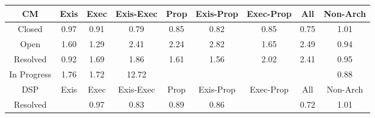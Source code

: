 \begin{tabular}{|c||c|c|c|c|c|c|c|c|}
\hline
\hline
CM & Exis & Exec & Exis-Exec & Prop & Exis-Prop & Exec-Prop & All & Non-Arch \\ 
\hline
Closed & \cellcolor[rgb]{0.9033971045751237,0.8087462949889188,0.4138372976034488} 0.97 & \cellcolor[rgb]{0.8916004190918556,0.7529086503681165,0.40282705781906525} 0.91 & \cellcolor[rgb]{0.8685648519067422,0.6438736323585793,0.3813271951129593} 0.79 & \cellcolor[rgb]{0.8807291226256074,0.7014511804278748,0.39268051445056684} 0.85 & \cellcolor[rgb]{0.8747451631553648,0.6731271056020599,0.3870954856116738} 0.82 & \cellcolor[rgb]{0.8802017540393747,0.6989549691197069,0.392188303770083} 0.85 & \cellcolor[rgb]{0.85983481583806,0.6025514616334836,0.37317916144885593} 0.75 & \cellcolor[rgb]{0.9096891000821404,0.8398527316178559,0.42} 1.01 \\ 
\hline
Open & \cellcolor[rgb]{0.8904952304211217,0.8307608986205313,0.42} 1.60 & \cellcolor[rgb]{0.9005786834118685,0.8355372710898324,0.42} 1.29 & \cellcolor[rgb]{0.8642360768680187,0.8183223522006404,0.42} 2.41 & \cellcolor[rgb]{0.8699399005608446,0.8210241634235579,0.42} 2.24 & \cellcolor[rgb]{0.8508587621281807,0.8119857294291382,0.42} 2.82 & \cellcolor[rgb]{0.889053250732825,0.8300778556102856,0.42} 1.65 & \cellcolor[rgb]{0.8617536885657807,0.817146484057475,0.42} 2.49 & \cellcolor[rgb]{0.8971101053857852,0.7789878321593828,0.4079694316933994} 0.94 \\ 
\hline
Resolved & \cellcolor[rgb]{0.8948395570728871,0.7682405701449992,0.40585025326802804} 0.92 & \cellcolor[rgb]{0.8875670887251007,0.8293738841329424,0.42} 1.69 & \cellcolor[rgb]{0.8819549896274135,0.826715521402459,0.42} 1.86 & \cellcolor[rgb]{0.8901338851737645,0.8305897350823095,0.42} 1.61 & \cellcolor[rgb]{0.8919800104648347,0.8314642154833427,0.42} 1.56 & \cellcolor[rgb]{0.8770768945376305,0.8244048447809829,0.42} 2.02 & \cellcolor[rgb]{0.8644057665996502,0.8184027315472027,0.42} 2.41 & \cellcolor[rgb]{0.9002116314134737,0.7936683886904421,0.4108641893192421} 0.95 \\ 
\hline
In Progress & \cellcolor[rgb]{0.8853518215164483,0.828324547034107,0.41999999999999993} 1.76 & \cellcolor[rgb]{0.886614368135457,0.8289225954325848,0.42} 1.72 & \cellcolor[rgb]{0.53,0.66,0.42} 12.72 &  &  &  &  & \cellcolor[rgb]{0.8860565852480087,0.7266678368405741,0.39765281289814136} 0.88 \\ 
\hline
\hline
DSP & Exis & Exec & Exis-Exec & Prop & Exis-Prop & Exec-Prop & All & Non-Arch \\ 
\hline
Resolved &  & \cellcolor[rgb]{0.9035473498670531,0.8094574560373843,0.4139775265425828} 0.97 & \cellcolor[rgb]{0.8769181770215416,0.6834127045686298,0.38912363188677207} 0.83 & \cellcolor[rgb]{0.8885680514229012,0.7385554434017321,0.39999684799470775} 0.89 & \cellcolor[rgb]{0.8826127157206837,0.7103668544112363,0.3944385346726381} 0.86 &  & \cellcolor[rgb]{0.8542002234274629,0.5758810575566577,0.36792020853229873} 0.72 & \cellcolor[rgb]{0.9097845024302668,0.8398979222038105,0.42} 1.01 \\ 

\end{tabular}
